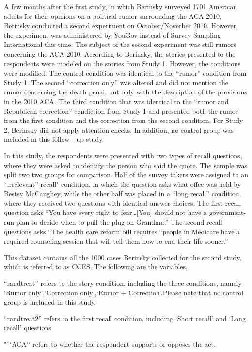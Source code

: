 \documentclass[AER]{AEA}
\begin{document}
A few months after the first study, in which Berinsky surveyed 1701
American adults for their opinions on a political rumor surrounding the
ACA 2010, Berinsky conducted a second experiment on October/Noverber
2010. However, the experiment was administered by YouGov instead of
Survey Sampling International this time. The subject of the second
experiment was still rumors concerning the ACA 2010. According to
Berinsky, the stories presented to the respondents were modeled on the
stories from Study 1. However, the conditions were modified. The control
condition was identical to the ``rumor'' condition from Study 1. The
second ``correction only'' was altered and did not mention the rumor
concerning the death penal, but only with the description of the
provisions in the 2010 ACA. The third condition that was identical to
the ``rumor and Republican correction'' condiction from Study 1 and
presented both the rumor from the first condition and the correction
from the second condition. For Study 2, Berinsky did not apply attention
checks. In addition, no control group was included in this follow - up
study.

In this study, the respondents were presented with two types of recall
questions, where they were asked to identify the person who said the
quote. The sample was split two two groups for comparison. Half of the
survey takers were assigned to an ``irrelevant'' recall" condition, in
which the question asks what offce was held by Bestsy McCaughey, while
the other half was placed in a ``long recall'' condition, where they
received two questions with identical answer choices. The first recall
question asks ``You have every right to fear\ldots{[}You{]} should not
have a government-run plan to decide when to pull the plug on Grandma.''
The second recall questions asks ``The health care reform bill requires
``people in Medicare have a required counseling session that will tell
them how to end their life sooner.''

This dataset contains all the 1000 cases Berinsky collected for the
second study, which is referred to as CCES. The following are the
variables,

``randtreat'' refers to the story condition, including the three
conditions, namely `Rumor only',`Correction only',`Rumor +
Correction'.Please note that no control group is included in this study.

``randtreat2'' refers to the first recall condition, including `Short
recall' and `Long recall' questions

"``ACA'' refers to whether the respondent supports or opposes the act.
\end{document}
